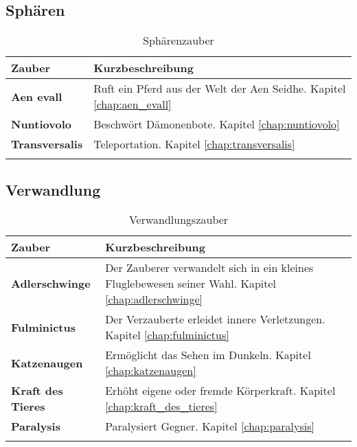 \subsection{Sphären}
\begin{longtable}{|p{5cm}|p{10cm}|}
\hline
\textbf{Zauber} & \textbf{Kurzbeschreibung} \\ \hline

\textbf{Aen evall} & Ruft ein Pferd aus der Welt der Aen Seidhe. Kapitel \ref{chap:aen_evall} \\ \hline

\textbf{Nuntiovolo} & Beschwört Dämonenbote. Kapitel \ref{chap:nuntiovolo} \\ \hline

\textbf{Transversalis} & Teleportation. Kapitel \ref{chap:transversalis} \\ \hline

\caption{Sphärenzauber}
\label{tab:sphaerenzauber}
\end{longtable}


\subsection{Verwandlung}
\begin{longtable}{|p{5cm}|p{10cm}|}
\hline
\textbf{Zauber} & \textbf{Kurzbeschreibung} \\ \hline

\textbf{Adlerschwinge} & Der Zauberer verwandelt sich in ein kleines Fluglebewesen seiner Wahl. Kapitel \ref{chap:adlerschwinge} \\ \hline

\textbf{Fulminictus} & Der Verzauberte erleidet innere Verletzungen. Kapitel \ref{chap:fulminictus} \\ \hline

\textbf{Katzenaugen} & Ermöglicht das Sehen im Dunkeln. Kapitel \ref{chap:katzenaugen} \\ \hline

\textbf{Kraft des Tieres} & Erhöht eigene oder fremde Körperkraft. Kapitel \ref{chap:kraft_des_tieres} \\ \hline

\textbf{Paralysis} & Paralysiert Gegner. Kapitel \ref{chap:paralysis} \\ \hline

\caption{Verwandlungszauber}
\label{tab:verwandlungszauber}
\end{longtable}


